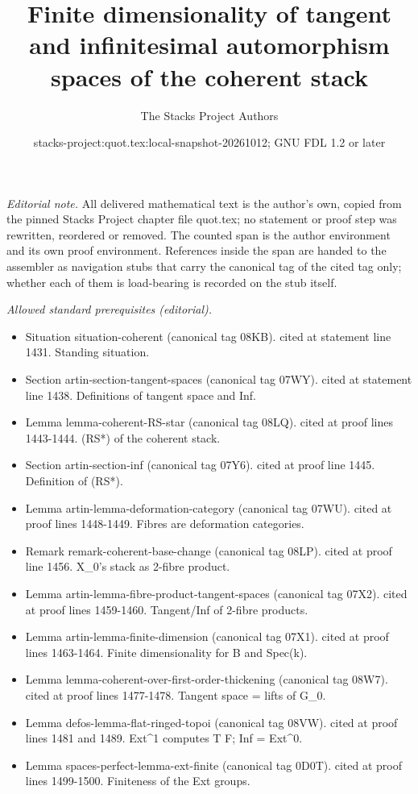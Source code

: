 \documentclass{stacks-project}
\title{Finite dimensionality of tangent and infinitesimal automorphism spaces of the coherent stack}
\author{The Stacks Project Authors}
\date{stacks-project:quot.tex:local-snapshot-20261012; GNU FDL 1.2 or later}
\theoremstyle{plain}
\theoremstyle{definition}
\theoremstyle{remark}
\numberwithin{equation}{subsection}
\begin{document}
\maketitle
\setcounter{subsection}{1}
\noindent\textit{Editorial note.} All delivered mathematical text is the author's own, copied from the pinned Stacks Project chapter file quot.tex; no statement or proof step was rewritten, reordered or removed. The counted span is the author environment and its own proof environment. References inside the span are handed to the assembler as navigation stubs that carry the canonical tag of the cited tag only; whether each of them is load-bearing is recorded on the stub itself.\par\medskip
\noindent\textit{Allowed standard prerequisites (editorial).}\begin{itemize}
\item Situation situation-coherent (canonical tag 08KB). cited at statement line 1431. Standing situation.
\item Section artin-section-tangent-spaces (canonical tag 07WY). cited at statement line 1438. Definitions of tangent space and Inf.
\item Lemma lemma-coherent-RS-star (canonical tag 08LQ). cited at proof lines 1443-1444. (RS*) of the coherent stack.
\item Section artin-section-inf (canonical tag 07Y6). cited at proof line 1445. Definition of (RS*).
\item Lemma artin-lemma-deformation-category (canonical tag 07WU). cited at proof lines 1448-1449. Fibres are deformation categories.
\item Remark remark-coherent-base-change (canonical tag 08LP). cited at proof line 1456. X\_0's stack as 2-fibre product.
\item Lemma artin-lemma-fibre-product-tangent-spaces (canonical tag 07X2). cited at proof lines 1459-1460. Tangent/Inf of 2-fibre products.
\item Lemma artin-lemma-finite-dimension (canonical tag 07X1). cited at proof lines 1463-1464. Finite dimensionality for B and Spec(k).
\item Lemma lemma-coherent-over-first-order-thickening (canonical tag 08W7). cited at proof lines 1477-1478. Tangent space = lifts of G\_0.
\item Lemma defos-lemma-flat-ringed-topoi (canonical tag 08VW). cited at proof lines 1481 and 1489. Ext\textasciicircum{}1 computes T F; Inf = Ext\textasciicircum{}0.
\item Lemma spaces-perfect-lemma-ext-finite (canonical tag 0D0T). cited at proof lines 1499-1500. Finiteness of the Ext groups.
\end{itemize}\medskip
\end{document}
